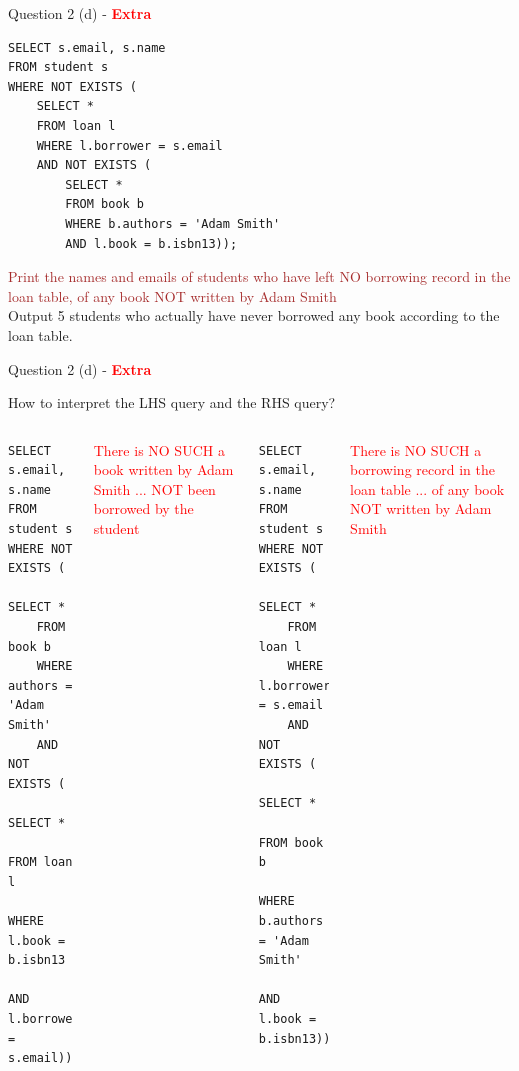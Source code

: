 \begin{frame}[fragile]{Question 2 (d) - \textcolor{red}{\textbf{Extra}}}

\begin{lstlisting}[style=sql-small]
SELECT s.email, s.name
FROM student s
WHERE NOT EXISTS (
	SELECT * 
	FROM loan l
	WHERE l.borrower = s.email
	AND NOT EXISTS (
		SELECT *
		FROM book b
		WHERE b.authors = 'Adam Smith'
		AND l.book = b.isbn13));
\end{lstlisting}

\textcolor{brown}{Print the names and emails of students who have left NO borrowing record in the loan table, of any book NOT written by Adam Smith}\\
Output 5 students who actually have never borrowed any book according to the loan table.
\end{frame}

\begin{frame}[fragile]{Question 2 (d) - \textcolor{red}{\textbf{Extra}}}

How to interpret the LHS query and the RHS query?
\begin{columns}[t]
\begin{lstlisting}[style=sql-small]
SELECT s.email, s.name
FROM student s
WHERE NOT EXISTS (
	SELECT * 
	FROM book b
	WHERE authors = 'Adam Smith' 
	AND NOT EXISTS (
		SELECT * 
		FROM loan l
		WHERE l.book = b.isbn13 
		AND l.borrower = s.email));
\end{lstlisting}

\textcolor{red}{There is NO SUCH a book written by Adam Smith ... NOT been borrowed by the student}\\

\begin{lstlisting}[style=sql-small]
SELECT s.email, s.name
FROM student s
WHERE NOT EXISTS (
	SELECT * 
	FROM loan l
	WHERE l.borrower = s.email
	AND NOT EXISTS (
		SELECT *
		FROM book b
		WHERE b.authors = 'Adam Smith'
		AND l.book = b.isbn13));
\end{lstlisting}

\textcolor{red}{There is NO SUCH a borrowing record in the loan table ... of any book NOT written by Adam Smith}\\

\end{columns}

\end{frame}

